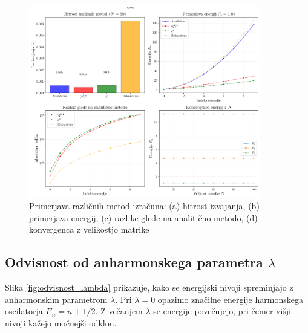 \documentclass[12pt,a4paper]{article}
\begin{document}
\begin{figure}[hb]
    \centering
    \includegraphics[width=0.9\textwidth]{anharmonic_oscillator_plots/01_primerjava_metod.pdf}
    \caption{Primerjava različnih metod izračuna: (a) hitrost izvajanja, (b) primerjava energij, (c) razlike glede na analitično metodo, (d) konvergenca z velikostjo matrike}
    \label{fig:primerjava_metod}
\end{figure}

\newpage

\subsection{Odvisnost od anharmonskega parametra $\lambda$}

Slika \ref{fig:odvisnost_lambda} prikazuje, 
kako se energijski nivoji spreminjajo z anharmonskim parametrom $\lambda$. 
Pri $\lambda = 0$ opazimo značilne energije harmonskega oscilatorja $E_n = n + 1/2$. 
Z večanjem $\lambda$ se energije povečujejo, pri čemer višji nivoji kažejo močnejši odklon.
\end{document}

